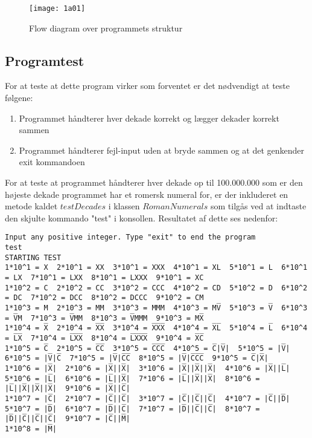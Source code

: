 	\begin{figure}[h!]
	  \centering
	      \texttt{[image: 1a01]}
	  \caption{Flow diagram over programmets struktur}\label{fig:1a01}
	\end{figure}
		 
	



\subsection{Programtest}
	For at teste at dette program virker som forventet er det nødvendigt at teste følgene:
 	\begin{enumerate}
 		\item Programmet håndterer hver dekade korrekt og lægger dekader korrekt sammen
 		\item Programmet håndterer fejl-input uden at bryde sammen og at det genkender exit kommandoen
 	\end{enumerate}
 	For at teste at programmet håndterer hver dekade op til 100.000.000 som er den højeste dekade programmet har et romersk numeral for, er der inkluderet en metode kaldet $testDecades$ i klassen $RomanNumerals$ som tilgås ved at indtaste den skjulte kommando "test" i konsollen. Resultatet af dette ses nedenfor:
	\begin{lstlisting}[caption=output fra kørsel af testDecades]
Input any positive integer. Type "exit" to end the program
test
STARTING TEST
1*10^1 = X  2*10^1 = XX  3*10^1 = XXX  4*10^1 = XL  5*10^1 = L  6*10^1 = LX  7*10^1 = LXX  8*10^1 = LXXX  9*10^1 = XC  
1*10^2 = C  2*10^2 = CC  3*10^2 = CCC  4*10^2 = CD  5*10^2 = D  6*10^2 = DC  7*10^2 = DCC  8*10^2 = DCCC  9*10^2 = CM  
1*10^3 = M  2*10^3 = MM  3*10^3 = MMM  4*10^3 = MV̅  5*10^3 = V̅  6*10^3 = V̅M  7*10^3 = V̅MM  8*10^3 = V̅MMM  9*10^3 = MX̅  
1*10^4 = X̅  2*10^4 = X̅X̅  3*10^4 = X̅X̅X̅  4*10^4 = X̅L̅  5*10^4 = L̅  6*10^4 = L̅X̅  7*10^4 = L̅X̅X̅  8*10^4 = L̅X̅X̅X̅  9*10^4 = X̅C̅  
1*10^5 = C̅  2*10^5 = C̅C̅  3*10^5 = C̅C̅C̅  4*10^5 = C̅|V̅|  5*10^5 = |V̅|  6*10^5 = |V̅|C̅  7*10^5 = |V̅|C̅C̅  8*10^5 = |V̅|C̅C̅C̅  9*10^5 = C̅|X̅|  
1*10^6 = |X̅|  2*10^6 = |X̅||X̅|  3*10^6 = |X̅||X̅||X̅|  4*10^6 = |X̅||L̅|  5*10^6 = |L̅|  6*10^6 = |L̅||X̅|  7*10^6 = |L̅||X̅||X̅|  8*10^6 = |L̅||X̅||X̅||X̅|  9*10^6 = |X̅||C̅|  
1*10^7 = |C̅|  2*10^7 = |C̅||C̅|  3*10^7 = |C̅||C̅||C̅|  4*10^7 = |C̅||D̅|  5*10^7 = |D̅|  6*10^7 = |D̅||C̅|  7*10^7 = |D̅||C̅||C̅|  8*10^7 = |D̅||C̅||C̅||C̅|  9*10^7 = |C̅||M̅|  
1*10^8 = |M̅|  
	\end{lstlisting}
